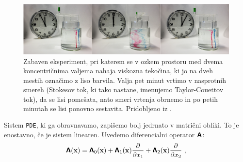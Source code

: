 \begin{figure}[!ht]
	\includegraphics[width = 1\textwidth]{Slike/TaylorCouette}
	\caption{Zabaven eksperiment, pri katerem se v ozkem prostoru med dvema koncentričnima valjema nahaja viskozna tekočina, ki jo na dveh mestih označimo z liso barvila. Valja pet minut vrtimo v nasprotnih smereh (Stokesov tok, ki tako nastane, imenujemo Taylor-Couettov tok), da se lisi pomešata, nato smeri vrtenja obrnemo in po petih minutah se lisi ponovno sestavita. Pridobljeno iz  \cite{Wiki-StokesFlow}.}
	\label{fig:TaylorCouette}
	\vspace{-0.3cm}
\end{figure}

Sistem \texttt{PDE}, ki ga obravnavamo, zapišemo bolj jedrnato v matrični obliki. To je enostavno, če je sistem linearen. Uvedemo diferencialni operator $\bm{\mathsf{A}}$:
\begin{equation}
	\bm{\mathsf{A}}(\mathbf{x}) = \bm{\mathsf{A}}_0(\mathbf{x}) + \bm{\mathsf{A}}_1(\mathbf{x}) \frac{\partial}{\partial x_1} + \bm{\mathsf{A}}_2(\mathbf{x}) \frac{\partial}{\partial x_2} \ ,
\end{equation}

\setlength{\textheight}{26.4cm}
\pagebreak
\setlength{\topmargin}{1.6cm}			%
\setlength{\headheight}{0.0cm}
\setlength{\headsep}{0.0cm}			%
\fancyhf{}
\fancyfoot[C]{\thepage}

